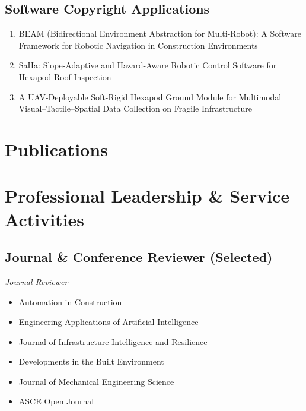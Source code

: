 \documentclass[11pt,a4paper]{article}
\begin{document}
\subsection*{Software Copyright Applications}
\begin{enumerate}[nosep, leftmargin=1.8em]
    \item BEAM (Bidirectional Environment Abstraction for Multi-Robot): A Software Framework for Robotic Navigation in Construction Environments
    \item SaHa: Slope-Adaptive and Hazard-Aware Robotic Control Software for Hexapod Roof Inspection
    \item A UAV-Deployable Soft-Rigid Hexapod Ground Module for Multimodal Visual--Tactile--Spatial Data Collection on Fragile Infrastructure
\end{enumerate}

\section{Publications}
{
}

\section{Professional Leadership \& Service Activities }

\subsection*{Journal \& Conference Reviewer (Selected)}

\textit{Journal Reviewer}
\begin{itemize}[nosep, leftmargin=1.5em]
    \item Automation in Construction
    \item Engineering Applications of Artificial Intelligence
    \item Journal of Infrastructure Intelligence and Resilience
    \item Developments in the Built Environment
    \item Journal of Mechanical Engineering Science
    \item ASCE Open Journal
\end{itemize}
\end{document}
